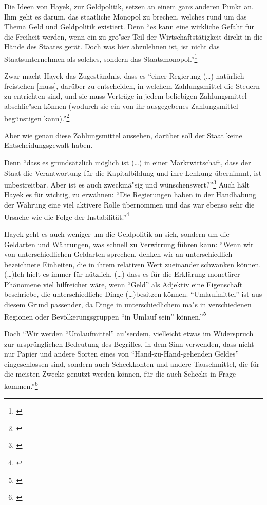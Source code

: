 \documentclass[
        onecolumn,
        a4paper,
        abstracton,
        parskip=half
        ,final
        ]{scrartcl}
\begin{document}
Die Ideen von Hayek, zur Geldpolitik, setzen an einem ganz anderen Punkt an. Ihm geht es darum, das staatliche Monopol zu brechen, welches rund um das Thema Geld und Geldpolitik existiert. Denn
"`es kann eine wirkliche Gefahr f{\"u}r die Freiheit werden, wenn ein zu gro{"s}er Teil der Wirtschaftst{\"a}tigkeit direkt in die H{\"a}nde des Staates ger{\"a}t. Doch was hier abzulehnen ist, ist nicht das Staatsunternehmen als solches, sondern das Staatsmonopol."'\footnote[64]{\citep*[S.290]{hayek1971}}

Zwar macht Hayek das Zugest{\"a}ndnis, dass es "`einer Regierung (\ldots) nat{\"u}rlich freistehen [muss], dar{\"u}ber zu entscheiden, in welchem Zahlungsmittel die Steuern zu entrichten sind, und sie muss Vertr{\"a}ge in jedem beliebigen Zahlungsmittel abschlie{"s}en k{\"o}nnen (wodurch sie ein von ihr ausgegebenes Zahlungsmittel beg{\"u}nstigen kann)."'\footnote[65]{\citep*[S.23]{Hayek1977}}

Aber wie genau diese Zahlungsmittel aussehen, dar{\"u}ber soll der Staat keine Entscheidungsgewalt haben.

Denn "`dass es grunds{\"a}tzlich m{\"o}glich ist (\ldots) in einer Marktwirtschaft, dass der Staat die Verantwortung f{\"u}r die Kapitalbildung und ihre Lenkung {\"u}bernimmt, ist unbestreitbar. Aber ist es auch zweckm{\"a}{"s}ig und w{\"u}nschenswert?"'\footnote[66]{\citep*[S.22]{Hayek1969}}
Auch h{\"a}lt Hayek es f{\"u}r wichtig, zu erw{\"a}hnen: "`Die Regierungen haben in der Handhabung der W{\"a}hrung eine viel aktivere Rolle {\"u}bernommen und das war ebenso sehr die Ursache wie die Folge der Instabilit{\"a}t."'\footnote[67]{ \citep*[S.409]{hayek1971}}

Hayek geht es auch weniger um die Geldpolitik an sich, sondern um die Geldarten und W{\"a}hrungen, was schnell zu Verwirrung f{\"u}hren kann: "`Wenn wir von unterschiedlichen Geldarten sprechen, denken wir an unterschiedlich bezeichnete Einheiten, die in ihrem relativen Wert zueinander schwanken k{\"o}nnen. (\ldots)Ich hielt es immer f{\"u}r n{\"u}tzlich, (\ldots) dass es f{\"u}r die Erkl{\"a}rung monet{\"a}rer Ph{\"a}nomene viel hilfreicher w{\"a}re, wenn "`Geld"' als Adjektiv eine Eigenschaft beschriebe, die unterschiedliche Dinge (\ldots)besitzen k{\"o}nnen. "`Umlaufmittel"' ist aus diesem Grund passender, da Dinge in unterschiedlichem ma{"s} in verschiedenen Regionen oder Bev{\"o}lkerungsgruppen "`in Umlauf sein"' k{\"o}nnen."'\footnote[68]{\citep*[S.40f]{Hayek1977}}

Doch "`Wir werden "`Umlaufmittel"' au{"s}erdem, vielleicht etwas im Widerspruch zur urspr{\"u}nglichen Bedeutung des Begriffes, in dem Sinn verwenden, dass nicht nur Papier und andere Sorten eines von "`Hand-zu-Hand-gehenden Geldes"' eingeschlossen sind, sondern auch Scheckkonten und andere Tauschmittel, die f{\"u}r die meisten Zwecke genutzt werden k{\"o}nnen, f{\"u}r die auch Schecks in Frage kommen."'\footnote[69]{\citep*[S.43]{Hayek1977}}
\end{document}
